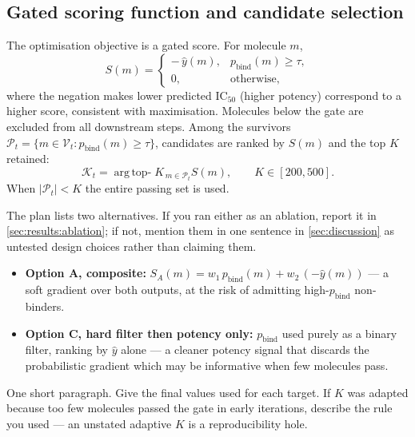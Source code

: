 \documentclass[11pt]{article}
\newcommand{\pbind}{p_{\mathrm{bind}}}          %
\newcommand{\yhat}{\hat{y}}                     %
\newcommand{\ICfifty}{\mathrm{IC}_{50}}
\newcommand{\Valid}{\mathcal{V}}                %
\newcommand{\Passed}{\mathcal{P}}               %
\newcommand{\TopK}{\mathcal{K}}                 %
\newcommand{\Kk}{K}
\begin{document}
\subsection{Gated scoring function and candidate selection}
\label{sec:methods:score}

The optimisation objective is a gated score. For molecule $m$,
\begin{equation}
  S(m) =
  \begin{cases}
    -\,\yhat(m), & \pbind(m) \ge \tau, \\[2pt]
    0,           & \text{otherwise},
  \end{cases}
  \label{eq:score}
\end{equation}
where the negation makes lower predicted $\ICfifty$ (higher potency)
correspond to a higher score, consistent with maximisation. Molecules below the
gate are excluded from all downstream steps. Among the survivors
$\Passed_t = \{m \in \Valid_t : \pbind(m) \ge \tau\}$, candidates are ranked by
$S(m)$ and the top $\Kk$ retained:
\begin{equation}
  \TopK_t
  = \operatorname*{arg\,top-}{\Kk}_{\,m \in \Passed_t} S(m),
  \qquad \Kk \in [200, 500].
  \label{eq:topk}
\end{equation}
When $|\Passed_t| < \Kk$ the entire passing set is used.

\begin{guide}
The plan lists two alternatives. If you ran either as an ablation, report it in
\cref{sec:results:ablation}; if not, mention them in one sentence in
\cref{sec:discussion} as untested design choices rather than claiming them.
\begin{itemize}\itemsep0pt
  \item \textbf{Option A, composite:}
        $S_A(m) = w_1\,\pbind(m) + w_2\,(-\yhat(m))$ --- a soft gradient over
        both outputs, at the risk of admitting high-$\pbind$ non-binders.
  \item \textbf{Option C, hard filter then potency only:} $\pbind$ used purely
        as a binary filter, ranking by $\yhat$ alone --- a cleaner potency
        signal that discards the probabilistic gradient which may be
        informative when few molecules pass.
\end{itemize}
\end{guide}

\begin{yourturn}[State your actual $\tau$ and $\Kk$, and why]
One short paragraph. Give the final values used for each target. If $\Kk$ was
adapted because too few molecules passed the gate in early iterations, describe
the rule you used --- an unstated adaptive $\Kk$ is a reproducibility hole.
\end{yourturn}
\end{document}
